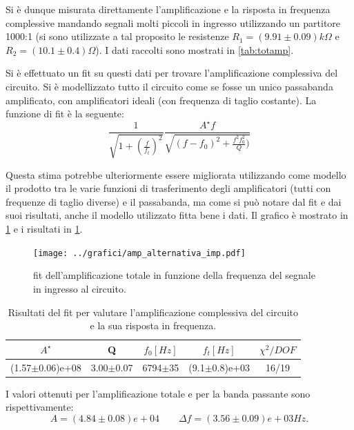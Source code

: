 \documentclass[a4paper,10pt]{article}
\begin{document}
Si è dunque misurata direttamente l'amplificazione e la risposta in frequenza  complessive mandando segnali molti piccoli in ingresso utilizzando un partitore 1000:1 (si sono utilizzate a tal proposito le resistenze $R_1 = (9.91\pm0.09) k\Omega $ e $R_2 = (10.1\pm0.4) \Omega$).
I dati raccolti sono mostrati in \cref{tab:totamp}.

Si è effettuato un fit su questi dati per trovare l'amplificazione complessiva del circuito. Si è modellizzato tutto il circuito come se fosse un unico passabanda amplificato, con amplificatori ideali (con frequenza di taglio costante). La funzione di fit è la seguente:
\begin{equation}
\label{eq:fittot}
\frac{1}{\sqrt{1+(\frac{f}{f_t})^2}} \frac{A^\star f}{\sqrt{(f - f_0)^2+ \frac{f^2 f_0^2}{Q} )}}
\end{equation}

Questa stima potrebbe ulteriormente essere migliorata utilizzando come modello il prodotto tra le varie funzioni di trasferimento degli amplificatori (tutti con frequenze di taglio diverse) e il passabanda, ma come si può notare dal fit e dai suoi risultati, anche il modello utilizzato fitta bene i dati. Il grafico è mostrato in \cref{fig:ampltot} e i risultati in \cref{tab:risult}.

\begin{figure}[H]
	\centering
	\texttt{[image: ../grafici/amp\_alternativa\_imp.pdf]}
	\caption{fit dell'amplificazione totale in funzione della frequenza del segnale in ingresso al circuito.}
	\label{fig:ampltot}
\end{figure}

\begin{table}[H]
	\centering
	\begin{tabular}{c|c|c|c|c}
	$A^\star$ & Q & $f_0[Hz]$ & $f_t[Hz]$ & $\chi^2/DOF$ \\
	\hline
	(1.57$\pm$0.06)e+08 & 3.00$\pm$0.07 & 6794$\pm$35 & (9.1$\pm$0.8)e+03 & 16/19 \\
	\end{tabular}
	\caption{Risultati del fit per valutare l'amplificazione complessiva del circuito e la sua risposta in frequenza.}
	\label{tab:risult}
\end{table}

I valori ottenuti per l'amplificazione totale e per la banda passante sono rispettivamente:
\[  A = (4.84\pm0.08)e+04 \qquad \Delta f = (3.56\pm0.09)e+03 Hz. \]
\end{document}
